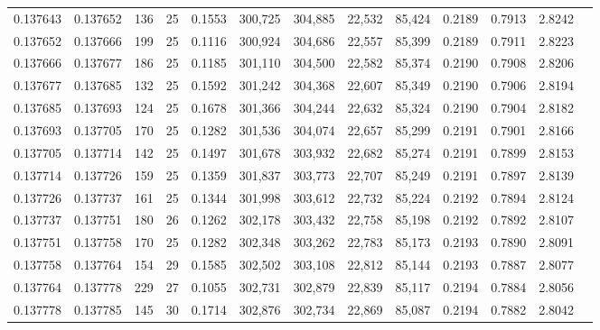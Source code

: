 \begin{tabular}{rrrrrrrrrrrrr}
0.137643 & 0.137652 &   136 &  25 &                                     0.1553 & 300,725 & 304,885 &  22,532 &  85,424 & 0.2189 & 0.7913 & 2.8242 \\
0.137652 & 0.137666 &   199 &  25 &                                     0.1116 & 300,924 & 304,686 &  22,557 &  85,399 & 0.2189 & 0.7911 & 2.8223 \\
0.137666 & 0.137677 &   186 &  25 &                                     0.1185 & 301,110 & 304,500 &  22,582 &  85,374 & 0.2190 & 0.7908 & 2.8206 \\
0.137677 & 0.137685 &   132 &  25 &                                     0.1592 & 301,242 & 304,368 &  22,607 &  85,349 & 0.2190 & 0.7906 & 2.8194 \\
0.137685 & 0.137693 &   124 &  25 &                                     0.1678 & 301,366 & 304,244 &  22,632 &  85,324 & 0.2190 & 0.7904 & 2.8182 \\
0.137693 & 0.137705 &   170 &  25 &                                     0.1282 & 301,536 & 304,074 &  22,657 &  85,299 & 0.2191 & 0.7901 & 2.8166 \\
0.137705 & 0.137714 &   142 &  25 &                                     0.1497 & 301,678 & 303,932 &  22,682 &  85,274 & 0.2191 & 0.7899 & 2.8153 \\
0.137714 & 0.137726 &   159 &  25 &                                     0.1359 & 301,837 & 303,773 &  22,707 &  85,249 & 0.2191 & 0.7897 & 2.8139 \\
0.137726 & 0.137737 &   161 &  25 &                                     0.1344 & 301,998 & 303,612 &  22,732 &  85,224 & 0.2192 & 0.7894 & 2.8124 \\
0.137737 & 0.137751 &   180 &  26 &                                     0.1262 & 302,178 & 303,432 &  22,758 &  85,198 & 0.2192 & 0.7892 & 2.8107 \\
0.137751 & 0.137758 &   170 &  25 &                                     0.1282 & 302,348 & 303,262 &  22,783 &  85,173 & 0.2193 & 0.7890 & 2.8091 \\
0.137758 & 0.137764 &   154 &  29 &                                     0.1585 & 302,502 & 303,108 &  22,812 &  85,144 & 0.2193 & 0.7887 & 2.8077 \\
0.137764 & 0.137778 &   229 &  27 &                                     0.1055 & 302,731 & 302,879 &  22,839 &  85,117 & 0.2194 & 0.7884 & 2.8056 \\
0.137778 & 0.137785 &   145 &  30 &                                     0.1714 & 302,876 & 302,734 &  22,869 &  85,087 & 0.2194 & 0.7882 & 2.8042 \\

\end{tabular}
